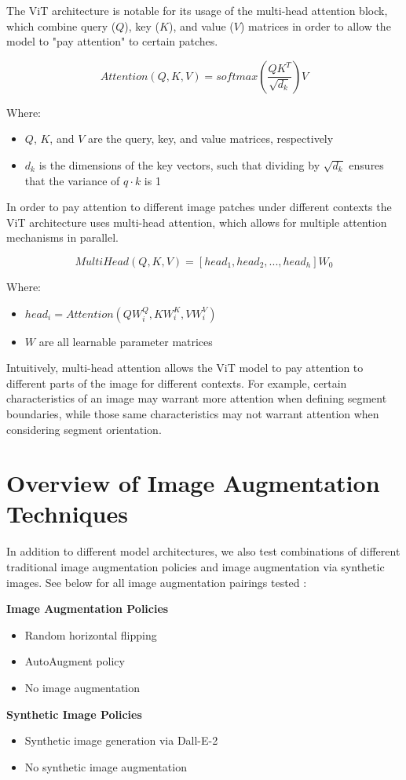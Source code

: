 \documentclass [MAS] {uclathes}
\begin{document}
The ViT architecture is notable for its usage of the multi-head attention block, which combine query (\(Q\)), key 
(\(K\)), and value (\(V\)) matrices in order to allow the model to "pay attention" to certain patches. 

\[Attention(Q,K,V) = softmax(\frac{QK^T}{\sqrt{d_k}})V\]

Where:
\begin{itemize}
    \item \(Q\), \(K\), and \(V\) are the query, key, and value matrices, respectively
    \item \(d_k\) is the dimensions of the key vectors, such that dividing by \(\sqrt{d_k}\) ensures that the variance 
    of \(q \cdot k\) is 1
\end{itemize}

In order to pay attention to different image patches under different contexts the ViT architecture uses multi-head 
attention, which allows for multiple attention mechanisms in parallel. 

\[MultiHead(Q,K,V) = [head_1, head_2, ... , head_h]W_0\]

Where:
\begin{itemize}
    \item \(head_i = Attention(QW_i^Q, KW_i^K, VW_i^V)\)
    \item \(W\) are all learnable parameter matrices
\end{itemize}

Intuitively, multi-head attention allows the ViT model to pay attention to different parts of the image for different 
contexts. For example, certain characteristics of an image may warrant more attention when defining segment boundaries, 
while those same characteristics may not warrant attention when considering segment orientation.

\chapter{Overview of Image Augmentation Techniques}
In addition to different model architectures, we also test combinations of different traditional image augmentation 
policies and image augmentation via synthetic images. See below for all image augmentation pairings tested \cite{AUG}:

\begin{multicols}{2}
    \raggedcolumns
    \textbf{Image Augmentation Policies}
    \begin{itemize}
        \item Random horizontal flipping
        \item AutoAugment policy
        \item No image augmentation
    \end{itemize}
    
    \columnbreak
    
    \textbf{Synthetic Image Policies}
    \begin{itemize}
        \item Synthetic image generation via Dall-E-2
        \item No synthetic image augmentation
    \end{itemize}
\end{multicols}
\end{document}
